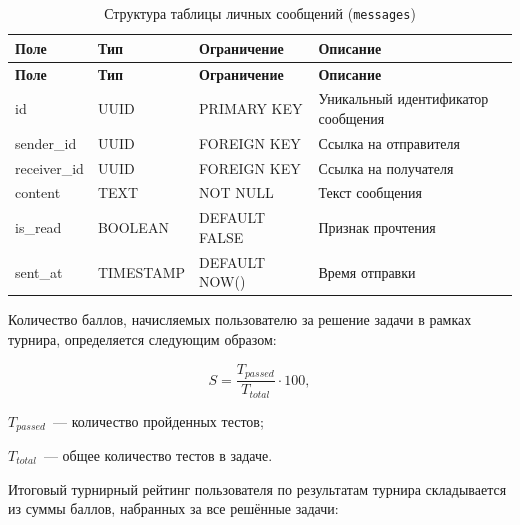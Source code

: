\begin{longtable}{|l|l|p{3.5cm}|p{5.5cm}|}
	\caption{Структура таблицы личных сообщений (\texttt{messages})} \label{tab:db_messages} \\

	\hline
	\textbf{Поле}  & \textbf{Тип} & \textbf{Ограничение} & \textbf{Описание}                        \\ \hline
	\endfirsthead

	\tabcont{\ref{tab:db_messages}}
	\textbf{Поле}  & \textbf{Тип} & \textbf{Ограничение} & \textbf{Описание}                        \\ \hline
	\endhead

	\hline
	\endfoot

	\hline
	\endlastfoot

	id             & UUID         & PRIMARY KEY          & Уникальный идентификатор сообщения       \\ \hline
	sender\_id     & UUID         & FOREIGN KEY          & Ссылка на отправителя                    \\ \hline
	receiver\_id   & UUID         & FOREIGN KEY          & Ссылка на получателя                     \\ \hline
	content        & TEXT         & NOT NULL             & Текст сообщения                          \\ \hline
	is\_read       & BOOLEAN      & DEFAULT FALSE        & Признак прочтения                        \\ \hline
	sent\_at       & TIMESTAMP    & DEFAULT NOW()        & Время отправки                           \\ \hline
\end{longtable}

Количество баллов, начисляемых пользователю за решение задачи в рамках турнира,
определяется следующим образом:

\begin{equation}
	S = \frac{T_{passed}}{T_{total}} \cdot 100,
	\label{eq:score}
\end{equation}

\begin{where}
	\item $T_{passed}$~--- количество пройденных тестов;
	\item $T_{total}$~--- общее количество тестов в задаче.
\end{where}

Итоговый турнирный рейтинг пользователя по результатам турнира складывается
из суммы баллов, набранных за все решённые задачи:

